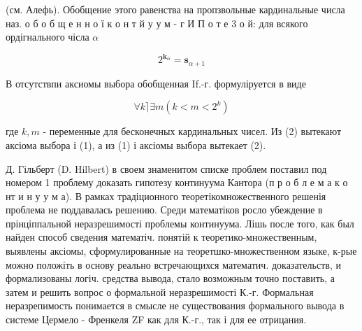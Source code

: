 \documentclass[10pt]{article}
\begin{document}
(см. Алефь). Обобщение этого равенства на пропзвольные кардинальные числа наз. о б о б щ е н н о ї к о н т й у у м - г И П о т е 3 о й: для всякого ордігнального чісла $\alpha$



\[

2^{\boldsymbol{k}_{\alpha}}=\mathbf{s}_{\alpha+1}

\]



В отсутствпи аксиомы выбора обобщенная If.-г. формуліруется в виде



\[

\forall k\rceil \exists m\left(k<m<2^{k}\right)

\]



где $k, m$ - переменные для бесконечных кардинальных чисел. Из (2) вытекают аксіома выбора і (1), а из (1) і аксіомы выбора вытекает (2).



Д. Гільберт (D. Hilbert) в своем знаменитом списке проблем поставил под номером 1 проблему доказать гипотезу континуума Кантора (п р о б л е м а к о нт и н у у м а). В рамках традіционного теоретікомножественного решенія проблема не поддавалась решению. Среди математіков росло убеждение в прінціппальной неразрешимості проблемы континуума. Лішь после того, как был найден способ сведения математіч. понятій к теоретико-множественным, выявлены аксіомы, сформулированные на теоретшко-множественном языке, к-рые можно положіть в основу реально встречающихся математич. доказательств, и формализованы логіч. средства вывода, стало возможным точно поставить, а затем и решить вопрос о формальной неразрешимості К.-г. Формальная неразрепимость понимается в смысле не существования формального вывода в системе Цермело - Френкеля ZF как для К.-г., так і для ее отрицания.
\end{document}

